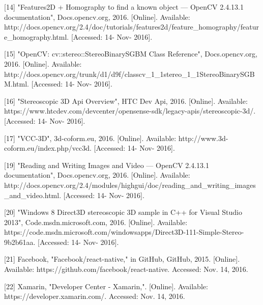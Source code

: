 \documentclass[10pt,draftclsnofoot,onecolumn]{IEEEtran}
\begin{document}
[14] "Features2D + Homography to find a known object — OpenCV 2.4.13.1 documentation", Docs.opencv.org, 2016. [Online]. Available: http://docs.opencv.org/2.4/doc/tutorials/features2d/feature_homography/feature_homography.html. [Accessed: 14- Nov- 2016].\\
 \vspace{2mm}


[15] "OpenCV: cv::stereo::StereoBinarySGBM Class Reference", Docs.opencv.org, 2016. [Online]. Available: http://docs.opencv.org/trunk/d1/d9f/classcv_1_1stereo_1_1StereoBinarySGBM.html. [Accessed: 14- Nov- 2016].\\
 \vspace{2mm}


[16] "Stereoscopic 3D Api Overview", HTC Dev Api, 2016. [Online]. Available: https://www.htcdev.com/devcenter/opensense-sdk/legacy-apis/stereoscopic-3d/. [Accessed: 14- Nov- 2016].\\
 \vspace{2mm}


[17] "VCC-3D", 3d-coform.eu, 2016. [Online]. Available: http://www.3d-coform.eu/index.php/vcc3d. [Accessed: 14- Nov- 2016].\\
 \vspace{2mm}


[19] "Reading and Writing Images and Video — OpenCV 2.4.13.1 documentation", Docs.opencv.org, 2016. [Online]. Available: http://docs.opencv.org/2.4/modules/highgui/doc/reading_and_writing_images_and_video.html. [Accessed: 14- Nov- 2016].\\
 \vspace{2mm}


[20] "Windows 8 Direct3D stereoscopic 3D sample in C++ for Visual Studio 2013", Code.msdn.microsoft.com, 2016. [Online]. Available: https://code.msdn.microsoft.com/windowsapps/Direct3D-111-Simple-Stereo-9b2b61aa. [Accessed: 14- Nov- 2016].\\
 \vspace{2mm}


[21] Facebook, "Facebook/react-native," in GitHub, GitHub, 2015. [Online]. Available: https://github.com/facebook/react-native. Accessed: Nov. 14, 2016.\\
 \vspace{2mm}


[22] Xamarin, "Developer Center - Xamarin,". [Online]. Available: https://developer.xamarin.com/. Accessed: Nov. 14, 2016.\\
 \vspace{2mm}
\end{document}
